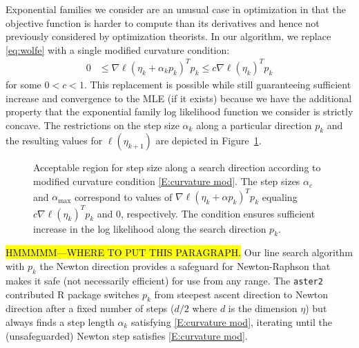 Exponential families we consider are an unusual case in optimization in that the 
objective function 
is harder to compute than its derivatives and hence not previously considered by 
optimization theorists.
In our algorithm, we replace \eqref{eq:wolfe} with a single modified curvature 
condition:
\begin{align} \label{E:curvature mod}
	 0 & \leq \nabla \ell( \eta_k + \alpha_k p_k)^T p_k \leq c \nabla \ell(\eta_k)^T p_k
\end{align}
for some $0 < c < 1$.  This replacement is possible while still guaranteeing 
sufficient increase and convergence to the MLE (if it exists) 
because we have the additional property that the exponential family log likelihood 
function we consider is strictly 
concave.  The restrictions on the step size $\alpha_k$ along a particular direction 
$p_k$ and the resulting values for 
$\ell(\eta_{k+1})$ are depicted in Figure~\ref{F:alpha_region}.  



\begin{figure}[h]
\centering
    \scalebox{.4}{}
	\caption[Acceptable region for step size along a search 
direction according to modified curvature condition]{Acceptable region for step size 
along a search direction according to modified curvature condition 
\eqref{E:curvature mod}. The step sizes $\alpha_{c}$ and $\alpha_{\textrm{max}}$ 
correspond to values of $\nabla \ell( \eta_k + \alpha p_k)^T p_k$ equaling 
$c \nabla \ell(\eta_k)^T p_k$ and $0$, 
respectively.  The condition ensures sufficient increase in the log likelihood along 
the search direction $p_k$.}
\label{F:alpha_region}
\end{figure}
 
 
\hl{HMMMMM---WHERE TO PUT THIS PARAGRAPH.}  Our line search algorithm with $p_k$ 
the Newton direction provides a
safeguard for Newton-Raphson that makes it safe (not necessarily efficient) for use 
from any range.
The \texttt{aster2} contributed R package \citep{aster:R} switches $p_k$ from steepest 
ascent direction to Newton direction
after a fixed number of steps ($d / 2$ where $d$ is the dimension $\eta$) but always 
finds a step length $\alpha_k$ satisfying
\eqref{E:curvature mod}, iterating until the (unsafeguarded) Newton step satisfies 
\eqref{E:curvature mod}.\\


